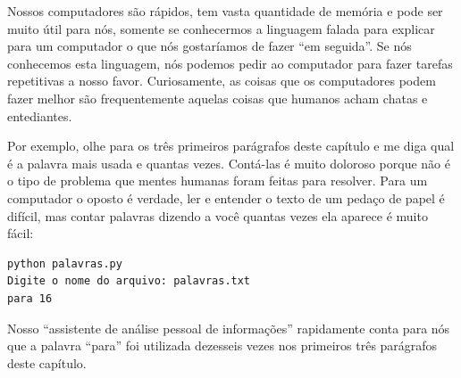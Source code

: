 Nossos computadores são rápidos, tem vasta quantidade de memória
e pode ser muito útil para nós, somente se conhecermos a linguagem
falada para explicar para um computador o que nós gostaríamos
de fazer ``em seguida''. Se nós conhecemos esta linguagem, nós
podemos pedir ao computador para fazer tarefas repetitivas a 
nosso favor. Curiosamente, as coisas que os computadores
podem fazer melhor são frequentemente aquelas coisas que humanos
acham chatas e entediantes.

Por exemplo, olhe para os três primeiros parágrafos deste
capítulo e me diga qual é a palavra mais usada e quantas 
vezes. Contá-las é muito doloroso porque 
não é o tipo de problema que mentes humanas foram feitas para 
resolver. Para um computador o oposto é verdade, ler e entender o texto
de um pedaço de papel é difícil, mas contar palavras dizendo a 
você quantas vezes ela aparece é muito fácil:

\beforeverb
\begin{verbatim}
python palavras.py
Digite o nome do arquivo: palavras.txt
para 16
\end{verbatim}
\afterverb

Nosso ``assistente de análise pessoal de informações'' rapidamente
conta para nós que a palavra ``para'' foi utilizada dezesseis vezes nos
primeiros três parágrafos deste capítulo.

